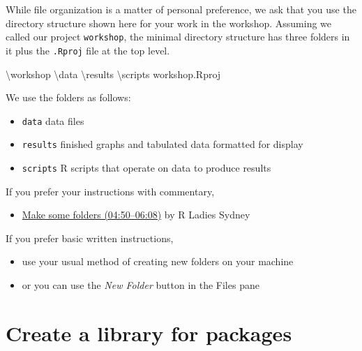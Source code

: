 \documentclass[
]{book}
\newenvironment{Shaded}{\begin{snugshade}}{\end{snugshade}}
\newcommand{\NormalTok}[1]{#1}
\providecommand{\tightlist}{%
  \setlength{\itemsep}{0pt}\setlength{\parskip}{0pt}}
\begin{document}
While file organization is a matter of personal preference, we ask that you use the directory structure shown here for your work in the workshop. Assuming we called our project \texttt{workshop}, the minimal directory structure has three folders in it plus the \texttt{.Rproj} file at the top level.

\begin{Shaded}
\begin{Highlighting}[]
\NormalTok{\textbackslash{}workshop}
\NormalTok{    \textbackslash{}data}
\NormalTok{    \textbackslash{}results}
\NormalTok{    \textbackslash{}scripts}
\NormalTok{    workshop.Rproj}
\end{Highlighting}
\end{Shaded}

We use the folders as follows:

\begin{itemize}
\tightlist
\item
  \texttt{data} data files
\item
  \texttt{results} finished graphs and tabulated data formatted for display\\
\item
  \texttt{scripts} R scripts that operate on data to produce results
\end{itemize}

If you prefer your instructions with commentary,

\begin{itemize}
\tightlist
\item
  \href{https://www.youtube.com/embed/kfcX5DEMAp4?start=290\&end=368}{Make some folders (04:50--06:08)} by R Ladies Sydney \citep{RLadiesSydney:2018:Lesson1}
\end{itemize}

If you prefer basic written instructions,

\begin{itemize}
\tightlist
\item
  use your usual method of creating new folders on your machine
\item
  or you can use the \emph{New Folder} button in the Files pane
\end{itemize}

\hypertarget{create-a-library-for-packages}{%
\section{Create a library for packages}\label{create-a-library-for-packages}}
\end{document}
